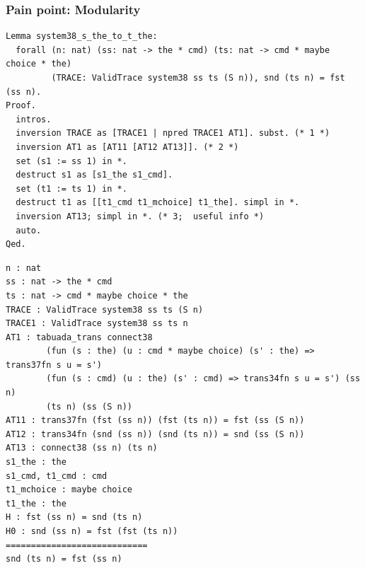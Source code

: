 \documentclass{beamer}
\begin{document}
\begin{frame}[fragile]
\frametitle{Pain point: Modularity}
{\tiny
  \begin{verbatim}
Lemma system38_s_the_to_t_the: 
  forall (n: nat) (ss: nat -> the * cmd) (ts: nat -> cmd * maybe choice * the)
         (TRACE: ValidTrace system38 ss ts (S n)), snd (ts n) = fst (ss n).
Proof.
  intros.
  inversion TRACE as [TRACE1 | npred TRACE1 AT1]. subst. (* 1 *)
  inversion AT1 as [AT11 [AT12 AT13]]. (* 2 *)
  set (s1 := ss 1) in *.
  destruct s1 as [s1_the s1_cmd].
  set (t1 := ts 1) in *.
  destruct t1 as [[t1_cmd t1_mchoice] t1_the]. simpl in *.
  inversion AT13; simpl in *. (* 3;  useful info *)
  auto.
Qed.
\end{verbatim}
\pause
\begin{verbatim}  
n : nat
ss : nat -> the * cmd
ts : nat -> cmd * maybe choice * the
TRACE : ValidTrace system38 ss ts (S n)
TRACE1 : ValidTrace system38 ss ts n
AT1 : tabuada_trans connect38
        (fun (s : the) (u : cmd * maybe choice) (s' : the) => trans37fn s u = s')
        (fun (s : cmd) (u : the) (s' : cmd) => trans34fn s u = s') (ss n) 
        (ts n) (ss (S n))
AT11 : trans37fn (fst (ss n)) (fst (ts n)) = fst (ss (S n))
AT12 : trans34fn (snd (ss n)) (snd (ts n)) = snd (ss (S n))
AT13 : connect38 (ss n) (ts n)
s1_the : the
s1_cmd, t1_cmd : cmd
t1_mchoice : maybe choice
t1_the : the
H : fst (ss n) = snd (ts n)
H0 : snd (ss n) = fst (fst (ts n))
============================
snd (ts n) = fst (ss n)
\end{verbatim}
}
\end{frame}
\end{document}
